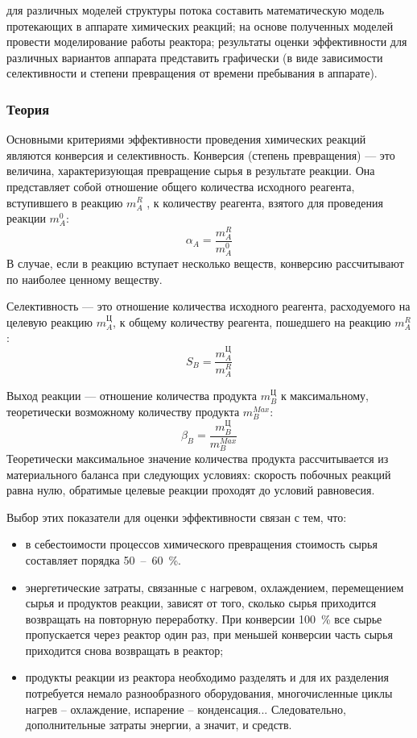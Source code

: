 
\goal для различных моделей структуры потока составить математическую модель протекающих в аппарате химических реакций; на основе полученных моделей провести моделирование работы реактора; результаты оценки эффективности для различных вариантов аппарата представить графически (в виде зависимости селективности и степени превращения от времени пребывания в аппарате).

\subsubsection{Теория}
Основными критериями эффективности проведения химических реакций являются конверсия и селективность. 
Конверсия (степень превращения) --- это величина, характеризующая превращение сырья в результате реакции. Она представляет собой отношение общего количества исходного реагента, вступившего в реакцию $m_A^R$ , к количеству реагента, взятого для проведения реакции $m_A^0$:
\begin{equation}\label{eq:rea.alpha}
	\alpha_A = \dfrac{m_A^R}{m_A^0}
\end{equation}
В случае, если в реакцию вступает несколько веществ, конверсию рассчитывают по наиболее ценному веществу.  

Селективность --- это отношение количества исходного реагента, расходуемого на целевую реакцию $m_A^Ц$, к общему количеству реагента, пошедшего на реакцию $m_A^R$:
\begin{equation}\label{eq:rea.s}
	S_B= \dfrac{m_A^Ц}{m_A^R}
\end{equation}

Выход реакции --- отношение количества продукта $m_B^Ц$ к максимальному, теоретически возможному количеству продукта $m_B^{Max}$:
\begin{equation}\label{eq:rea.beta}
	\beta_B=\dfrac{m_B^Ц}{m_B^{Max}}
\end{equation}
Теоретически максимальное значение количества продукта рассчитывается из материального баланса при следующих условиях: скорость побочных реакций равна нулю, обратимые целевые реакции проходят до условий равновесия.

Выбор этих показатели для оценки эффективности связан с тем, что:
\begin{itemize}
	\item в себестоимости процессов химического превращения стоимость сырья составляет порядка 50\ --\ 60\ \%.
	\item энергетические затраты, связанные с нагревом, охлаждением, перемещением сырья и продуктов реакции, зависят от того, сколько сырья приходится возвращать на повторную переработку. При конверсии 100\ \% все сырье пропускается через реактор один раз, при меньшей конверсии часть сырья приходится снова возвращать в реактор;
	\item продукты реакции из реактора необходимо разделять и для их разделения потребуется немало разнообразного оборудования, многочисленные циклы нагрев -- охлаждение, испарение -- конденсация... Следовательно, дополнительные затраты энергии, а значит, и средств.
\end{itemize}

